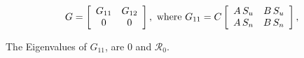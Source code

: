 \documentclass{article}
\newcommand{\Rnum}{\mathcal{R}_0}
\theoremstyle{definition} %
\begin{document}
\begin{equation}
G = \left[ \begin {array}{cc}
G_{11}&G_{12}\\
0&0
\end {array} \right], \text{ where } \\
G_{11} =C
\left[\begin {array}{cc}
A\,S_u & B\,S_u\\
A\,S_n & B\,S_n
\end {array}\right],
\end{equation}

The Eigenvalues of $G_{11}$, are 0 and $\Rnum$.
\end{document}
